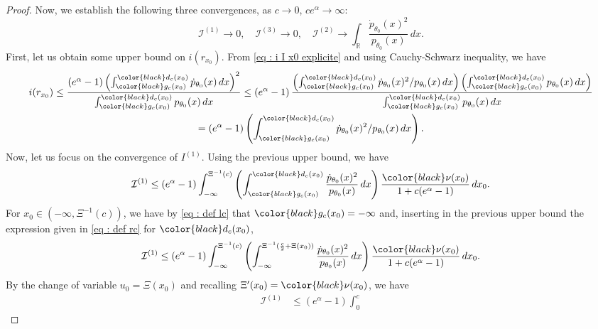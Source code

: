 \documentclass[a4paper, 11pt]{article}
\theoremstyle{definition}
\newcommand{\modar}{\color{black}}
\begin{document}
{\begin{proof}
Now, we establish the following three convergences, as $c \to 0$, $ce^\alpha\to\infty$:
\begin{equation}  \label{eq : a montrer trois cv}
	\mathcal{I}^{(1)} \to 0, \quad 	\mathcal{I}^{(3)} \to 0, \quad 	\mathcal{I}^{(2)} \to \int_\mathbb{R} \frac{\dot{p}_{\theta_0}(x)^2}{p_{\theta_0}(x)}\, dx.
\end{equation} 
First, let us obtain some upper bound on $i(r_{x_0})$.  From \eqref{eq : i I x0 explicite} and using Cauchy-Schwarz inequality, we have
\begin{multline} \label{eq : bound on i r x0}
	i(r_{x_0}) \le \frac { \left(e^\alpha-1\right)  \left( \int_{{\modar g_c}(x_0)}^{{\modar d_c}(x_0)}\dot{p}_{\theta_0}(x)\,dx\right)^2}
	{ \int_{{\modar g_c}(x_0)}^{{\modar d_c}(x_0)} p_{\theta_0}(x)\,dx} 
	\le   \left(e^\alpha-1\right)  \frac{ \left( \int_{{\modar g_c}(x_0)}^{{\modar d_c}(x_0)} \dot{p}_{\theta_0}(x)^2 /  p_{\theta_0}(x) \,dx\right)
	 \left( \int_{{\modar g_c}(x_0)}^{{\modar d_c}(x_0)} p_{\theta_0}(x) \,dx\right) }
	{ \int_{{\modar g_c}(x_0)}^{{\modar d_c}(x_0)} p_{\theta_0}(x)\,dx} 	
\\	= \left(e^\alpha-1\right) \left( \int_{{\modar g_c}(x_0)}^{{\modar d_c}(x_0)} \dot{p}_{\theta_0}(x)^2 /  p_{\theta_0}(x) \,dx\right).
\end{multline}
Now, let us focus on the convergence of  $	I^{(1)}$. Using the previous upper bound, we have
\begin{equation*}
		\mathcal{I}^{(1)} \le \left(e^\alpha-1\right) \int_{-\infty}^{\Xi^{-1}(c)}  
		\left( \int_{{\modar g_c}(x_0)}^{{\modar d_c}(x_0)}  \frac{ \dot{p}_{\theta_0}(x)^2 }{ p_{\theta_0}(x) } \, dx
		\right)
		\frac{{\modar\nu}(x_0)}{1+c(e^\alpha-1)} \,	dx_0.
\end{equation*}
For $x_0 \in (-\infty, \Xi^{-1}(c))$, we have by \eqref{eq : def lc} that
${\modar g_c}(x_0)=-\infty$ and, inserting in the previous upper bound the expression given in \eqref{eq : def rc}
for ${\modar d_c}(x_0)$, %
\begin{equation*}
		\mathcal{I}^{(1)}  \le  \left(e^\alpha-1\right) \int_{-\infty}^{\Xi^{-1}(c)}  
		\left( \int_{-\infty}^{ 	\Xi^{-1}(\frac{c}{2}+\Xi(x_0)) }  \frac{ \dot{p}_{\theta_0}(x)^2 }{ p_{\theta_0}(x) } \,dx \right)
		\frac{{\modar \nu}(x_0)}{1+c(e^\alpha-1)} \,dx_0 .
\end{equation*}
By the change of variable $u_0=\Xi(x_0)$ and recalling $\Xi'(x_0)={\modar \nu}(x_0)$, we have
\begin{align*}
	\mathcal{I}^{(1)}& \le  \left(e^\alpha-1\right) \int_{0}^{c}  

\end{align*}
\end{proof}}
\end{document}
